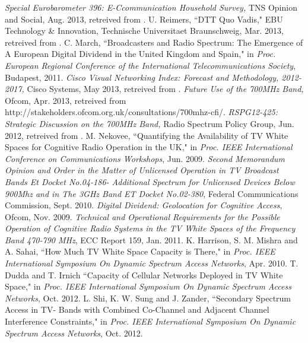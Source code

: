 \documentclass[journal]{IEEEtran}
\begin{document}

\begin{thebibliography}{40}  

 \emph{Special Eurobarometer 396: E-Ccommunication Household Survey,} TNS Opinion and Social, Aug. 2013, retreived from .
 U. Reimers, ``DTT Quo Vadis," EBU Technology \& Innovation, Technische Universitaet Braunschweig, Mar. 2013, retreived from .
 C. March, ``Broadcasters and Radio Spectrum: The Emergence of A European Digital Dividend in the United Kingdom and Spain," in \emph{Proc. European Regional Conference of the International Telecommunications Society}, Budapest, 2011.
 \emph{Cisco Visual Networking Index: Forecast and Methodology, 2012-2017,} Cisco Systems, May 2013, retreived from .
 \emph{Future Use of the 700MHz Band,} Ofcom, Apr. 2013, retreived from http://stakeholders.ofcom.org.uk/consultations/700mhz-cfi/.
  \emph{RSPG12-425: Strategic Discussion on the 700MHz Band,} Radio Spectrum Policy Group, Jun. 2012, retreived from .
 M. Nekovee, ``Quantifying the Availability of TV White Spaces for Cognitive Radio Operation in the UK," in \emph{Proc. IEEE International Conference on Communications Workshops}, Jun. 2009.
 \emph{Second Memorandum Opinion and Order in the Matter of Unlicensed Operation in TV Broadcast Bands Et Docket No.04-186- Additional Spectrum for Unlicensed Devices Below 900Mhz and in The 3GHz Band ET Docket No.02-380}, Federal Communications Commission, Sept. 2010.
 \emph{Digital Dividend: Geolocation for Cognitive Access}, Ofcom, Nov. 2009.
 \emph{Technical and Operational Requirements for the Possible Operation of Cognitive Radio Systems in the TV White Spaces of the Frequency Band 470-790 MHz}, ECC Report 159, Jan. 2011.
 K. Harrison, S. M. Mishra and A. Sahai, ``How Much TV White Space Capacity is There," in \emph{Proc. IEEE International Symposium On Dynamic Spectrum Access Networks}, Apr. 2010.
 T. Dudda and T. Irnich ``Capacity of Cellular Networks Deployed in TV White Space," in \emph{Proc. IEEE International Symposium On Dynamic Spectrum Access Networks}, Oct. 2012.
 L. Shi, K. W. Sung and J. Zander, ``Secondary Spectrum Access in TV- Bands with Combined Co-Channel and Adjacent Channel Interference Constraints," in \emph{Proc. IEEE International Symposium On Dynamic Spectrum Access Networks}, Oct. 2012.

\end{thebibliography}
\end{document}
